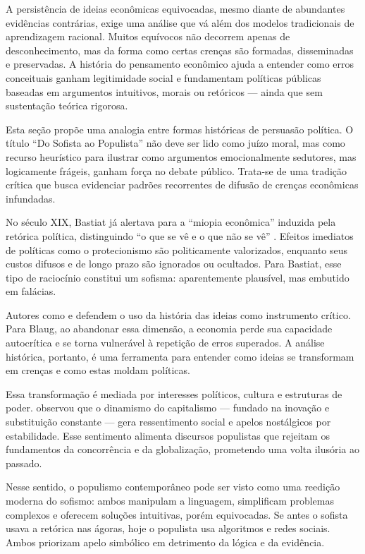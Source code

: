 
A persistência de ideias econômicas equivocadas, mesmo diante de abundantes evidências contrárias, exige uma análise que vá além dos modelos tradicionais de aprendizagem racional. Muitos equívocos não decorrem apenas de desconhecimento, mas da forma como certas crenças são formadas, disseminadas e preservadas. A história do pensamento econômico ajuda a entender como erros conceituais ganham legitimidade social e fundamentam políticas públicas baseadas em argumentos intuitivos, morais ou retóricos — ainda que sem sustentação teórica rigorosa.

Esta seção propõe uma analogia entre formas históricas de persuasão política. O título ``Do Sofista ao Populista'' não deve ser lido como juízo moral, mas como recurso heurístico para ilustrar como argumentos emocionalmente sedutores, mas logicamente frágeis, ganham força no debate público. Trata-se de uma tradição crítica que busca evidenciar padrões recorrentes de difusão de crenças econômicas infundadas.

No século XIX, Bastiat já alertava para a ``miopia econômica'' induzida pela retórica política, distinguindo ``o que se vê e o que não se vê'' \cite{bastiat1859sofismas}. Efeitos imediatos de políticas como o protecionismo são politicamente valorizados, enquanto seus custos difusos e de longo prazo são ignorados ou ocultados. Para Bastiat, esse tipo de raciocínio constitui um sofisma: aparentemente plausível, mas embutido em falácias.

Autores como  e  defendem o uso da história das ideias como instrumento crítico. Para Blaug, ao abandonar essa dimensão, a economia perde sua capacidade autocrítica e se torna vulnerável à repetição de erros superados. A análise histórica, portanto, é uma ferramenta para entender como ideias se transformam em crenças e como estas moldam políticas.

Essa transformação é mediada por interesses políticos, cultura e estruturas de poder.  observou que o dinamismo do capitalismo — fundado na inovação e substituição constante — gera ressentimento social e apelos nostálgicos por estabilidade. Esse sentimento alimenta discursos populistas que rejeitam os fundamentos da concorrência e da globalização, prometendo uma volta ilusória ao passado.

Nesse sentido, o populismo contemporâneo pode ser visto como uma reedição moderna do sofismo: ambos manipulam a linguagem, simplificam problemas complexos e oferecem soluções intuitivas, porém equivocadas. Se antes o sofista usava a retórica nas ágoras, hoje o populista usa algoritmos e redes sociais. Ambos priorizam apelo simbólico em detrimento da lógica e da evidência.

